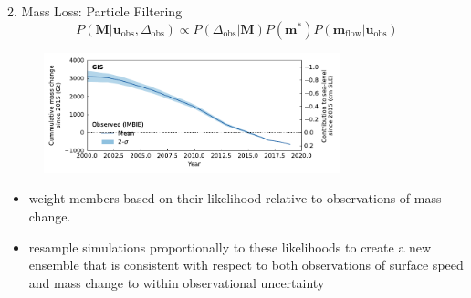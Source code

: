 \documentclass[hide notes,intlimits]{beamer}
\begin{document}
\begin{frame}{2. Mass Loss: Particle Filtering}
  \begin{equation*}
    \label{eq:parameter_posterior}
    P(\mathbf{M}|\mathbf{u}_{\mathrm{obs}},\Delta_{\mathrm{obs}}) \propto P(\Delta_{\mathrm{obs}}|\mathbf{M}) P(\mathbf{m}^{*}) P(\mathbf{m}_{\mathrm{flow}}|\mathbf{u}_{\mathrm{obs}})
  \end{equation*}
  \begin{minipage}[t][4cm][t]{\textwidth}
    \begin{figure}
    \includegraphics[height=3.5cm]{GIS_hist_only_obs}
    \end{figure}
  \end{minipage}
  \begin{itemize}
  \item  weight members based on their likelihood relative to observations of mass change.
  \item resample simulations proportionally to these likelihoods to create a new ensemble that is consistent with respect to both  observations of surface speed and mass change to within observational uncertainty
  \end{itemize}
\end{frame}
\end{document}
